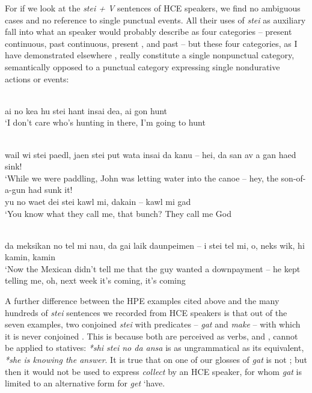 For if we look at the \textit{stei + V} sentences of HCE speakers, we find no ambiguous cases and no reference to single punctual events. All their uses of \textit{stei} as auxiliary fall into what an  speaker would probably describe as four categories -- present continuous, past con\-tinuous, present , and past  -- but these four categories, as I have demonstrated elsewhere \citep[Chapter 2]{Bickerton1975}, really constitute a single nonpunctual category, semantically opposed to a punctual category expressing single nondurative actions or events:

\ea\label{ex:52}
\\
ai no kea hu stei hant insai dea, ai gon hunt \\
\glt `I don't care who's hunting in there, I'm going to hunt
\z

\ea\label{ex:53}
\\
wail wi stei paedl, jaen stei put wata insai da kanu -- hei, da san av a gan haed sink!\\
\glt `While we were paddling, John was letting water into the canoe -- hey, the son-of-a-gun had sunk it!
\z
\ea\label{ex:54}
 \\
 yu no waet dei stei kawl mi, dakain -- kawl mi gad\\
\glt `You know what they call me, that bunch? They call me God
\z

\ea\label{ex:55}
\\
da meksikan no tel mi nau, da gai laik daunpeimen -- i stei tel mi, o, neks wik, hi kamin, kamin\\
\glt `Now the Mexican didn't tell me that the guy wanted a down\-payment -- he kept telling me, oh, next week it's coming, it's coming
\z

A further difference between the HPE examples cited above and the many hundreds of \textit{stei} sentences we recorded from HCE speakers is that out of the seven examples, two conjoined \textit{stei} with predicates -- \textit{gat} and \textit{make} -- with which it is never conjoined . This is because both are perceived as  verbs, and ,  cannot be applied to statives: \textit{*shi stei no da ansa} is as ungrammatical as its  equivalent, \textit{*she is knowing the answer}. It is true that on one of our glosses of  \textit{gat} is not ; but then it would not be used to express \textit{collect} by an HCE speaker, for whom \textit{gat} is limited to an alternative form for \textit{get} `have.

